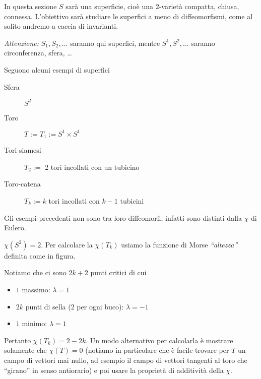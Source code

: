

In questa sezione $S$ sarà una superficie, cioè una 2-varietà compatta, chiusa, connessa. L'obiettivo sarà studiare le superfici a meno di diffeomorfismi, come al solito andremo a caccia di invarianti.

\emph{Attenzione:} $S_1, S_2, \dots$ saranno qui superfici, mentre $S^1, S^2, \dots$ saranno circonferenza, sfera, \dots

\begin{es} Seguono alcuni esempi di superfici
\begin{description}
\item [Sfera] $S^2$
\item [Toro] $T := T_1 := S^1 \times S^1$
\item [Tori siamesi] $T_2 :=$ 2 tori incollati con un tubicino
\begin{center}
  
\end{center}
\item [Toro-catena] $T_k := k$ tori incollati con $k-1$ tubicini
\begin{center}
  
\end{center}
\end{description}
\end{es}

\begin{oss}
Gli esempi precedenti non sono tra loro diffeomorfi, infatti sono distinti dalla $\chi$ di Eulero.

$\chi(S^2) = 2$. Per calcolare la $\chi(T_k)$ usiamo la funzione di Morse \emph{``altezza''} definita come in figura.
\begin{center}
  
\end{center}
Notiamo che ci sono $2k + 2$ punti critici di cui
\begin{itemize}
\item $1$ massimo: $\lambda = 1$
\item $2k$ punti di sella (2 per ogni buco): $\lambda = -1$
\item $1$ minimo: $\lambda = 1$
\end{itemize}
Pertanto $\chi(T_k) = 2 - 2k$. Un modo alternativo per calcolarla è mostrare solamente che $\chi(T) = 0$ (notiamo in particolare che è facile trovare per $T$ un campo di vettori mai nullo, ad esempio il campo di vettori tangenti al toro che ``girano'' in senso antiorario) e poi usare la proprietà di additività della $\chi$.
\end{oss}

